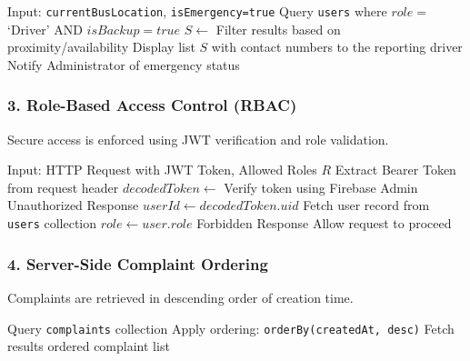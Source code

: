 \documentclass[conference]{IEEEtran}
\begin{document}
\begin{algorithm}
\caption{Emergency Backup Driver Discovery}
\begin{algorithmic}[1]
\STATE Input: \texttt{currentBusLocation}, \texttt{isEmergency=true}
\STATE Query \texttt{users} where $role = $ `Driver' AND $isBackup = true$
\STATE $S \gets$ Filter results based on proximity/availability
\STATE Display list $S$ with contact numbers to the reporting driver
\STATE Notify Administrator of emergency status
\end{algorithmic}
\end{algorithm}

\vspace{0.5cm}

\subsubsection{3. Role-Based Access Control (RBAC)}
Secure access is enforced using JWT verification and role validation.

\begin{algorithm}
\caption{Middleware-Based RBAC Authorization}
\begin{algorithmic}[1]
\STATE Input: HTTP Request with JWT Token, Allowed Roles $R$
\STATE Extract Bearer Token from request header
\STATE $decodedToken \gets$ Verify token using Firebase Admin
    \STATE \RETURN Unauthorized Response
\ENDIF
\STATE $userId \gets decodedToken.uid$
\STATE Fetch user record from \texttt{users} collection
\STATE $role \gets user.role$
    \STATE \RETURN Forbidden Response
\ENDIF
\STATE Allow request to proceed
\end{algorithmic}
\end{algorithm}

\vspace{0.5cm}

\subsubsection{4. Server-Side Complaint Ordering}
Complaints are retrieved in descending order of creation time.

\begin{algorithm}
\caption{Complaint Retrieval with Ordering}
\begin{algorithmic}[1]
\STATE Query \texttt{complaints} collection
\STATE Apply ordering: \texttt{orderBy(createdAt, desc)}
\STATE Fetch results
\STATE \RETURN ordered complaint list
\end{algorithmic}
\end{algorithm}
\end{document}
